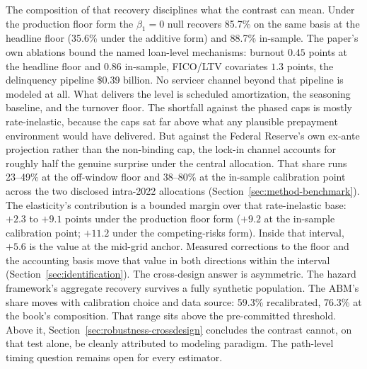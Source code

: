 \documentclass[12pt]{article}
\begin{document}
The composition of that recovery disciplines what the contrast can mean. Under the production floor form the $\beta_1 = 0$ null recovers 85.7\% on the same basis at the headline floor (35.6\% under the additive form) and 88.7\% in-sample. The paper's own ablations bound the named loan-level mechanisms: burnout $0.45$ points at the headline floor and $0.86$ in-sample, FICO/LTV covariates $1.3$ points, the delinquency pipeline \$0.39 billion. No servicer channel beyond that pipeline is modeled at all. What delivers the level is scheduled amortization, the seasoning baseline, and the turnover floor. The shortfall against the phased caps is mostly rate-inelastic, because the caps sat far above what any plausible prepayment environment would have delivered. But against the Federal Reserve's own ex-ante projection rather than the non-binding cap, the lock-in channel accounts for roughly half the genuine surprise under the central allocation. That share runs 23--49\% at the off-window floor and 38--80\% at the in-sample calibration point across the two disclosed intra-2022 allocations (Section~\ref{sec:method-benchmark}). The elasticity's contribution is a bounded margin over that rate-inelastic base: $+2.3$ to $+9.1$ points under the production floor form ($+9.2$ at the in-sample calibration point; $+11.2$ under the competing-risks form). Inside that interval, $+5.6$ is the value at the mid-grid anchor. Measured corrections to the floor and the accounting basis move that value in both directions within the interval (Section~\ref{sec:identification}). The cross-design answer is asymmetric. The hazard framework's aggregate recovery survives a fully synthetic population. The ABM's share moves with calibration choice and data source: 59.3\% recalibrated, 76.3\% at the book's composition. That range sits above the pre-committed threshold. Above it, Section~\ref{sec:robustness-crossdesign} concludes the contrast cannot, on that test alone, be cleanly attributed to modeling paradigm. The path-level timing question remains open for every estimator.
\end{document}
